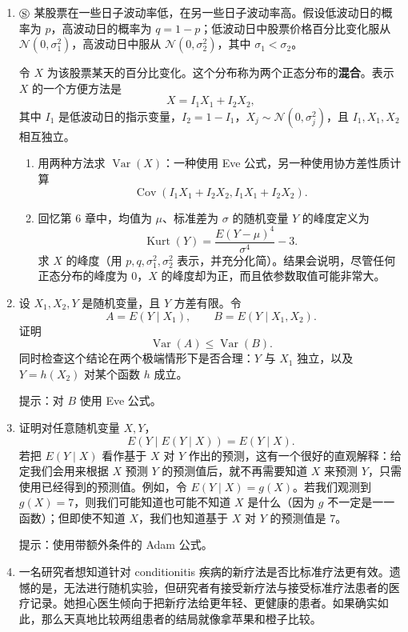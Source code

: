 \documentclass[UTF8, 12pt, fontset=fandol, oneside]{ctexart}
\begin{document}
\begin{enumerate}
  \item $\circledS$ 某股票在一些日子波动率低，在另一些日子波动率高。假设低波动日的概率为 $p$，高波动日的概率为 $q=1-p$；低波动日中股票价格百分比变化服从 $\mathcal N(0,\sigma_1^2)$，高波动日中服从 $\mathcal N(0,\sigma_2^2)$，其中 $\sigma_1<\sigma_2$。

  令 $X$ 为该股票某天的百分比变化。这个分布称为两个正态分布的\textbf{混合}。表示 $X$ 的一个方便方法是
  \[
    X=I_1X_1+I_2X_2,
  \]
  其中 $I_1$ 是低波动日的指示变量，$I_2=1-I_1$，$X_j\sim\mathcal N(0,\sigma_j^2)$，且 $I_1,X_1,X_2$ 相互独立。
  \begin{enumerate}
    \item[(a)] 用两种方法求 $\operatorname{Var}(X)$：一种使用 Eve 公式，另一种使用协方差性质计算
    \[
      \operatorname{Cov}(I_1X_1+I_2X_2,I_1X_1+I_2X_2).
    \]
    \item[(b)] 回忆第 6 章中，均值为 $\mu$、标准差为 $\sigma$ 的随机变量 $Y$ 的峰度定义为
    \[
      \operatorname{Kurt}(Y)=\frac{E(Y-\mu)^4}{\sigma^4}-3.
    \]
    求 $X$ 的峰度（用 $p,q,\sigma_1^2,\sigma_2^2$ 表示，并充分化简）。结果会说明，尽管任何正态分布的峰度为 $0$，$X$ 的峰度却为正，而且依参数取值可能非常大。
  \end{enumerate}

  \item 设 $X_1,X_2,Y$ 是随机变量，且 $Y$ 方差有限。令
  \[
    A=E(Y\mid X_1),\qquad B=E(Y\mid X_1,X_2).
  \]
  证明
  \[
    \operatorname{Var}(A)\le \operatorname{Var}(B).
  \]
  同时检查这个结论在两个极端情形下是否合理：$Y$ 与 $X_1$ 独立，以及 $Y=h(X_2)$ 对某个函数 $h$ 成立。

  \noindent 提示：对 $B$ 使用 Eve 公式。

  \item 证明对任意随机变量 $X,Y$，
  \[
    E(Y\mid E(Y\mid X))=E(Y\mid X).
  \]
  若把 $E(Y\mid X)$ 看作基于 $X$ 对 $Y$ 作出的预测，这有一个很好的直观解释：给定我们会用来根据 $X$ 预测 $Y$ 的预测值后，就不再需要知道 $X$ 来预测 $Y$，只需使用已经得到的预测值。例如，令 $E(Y\mid X)=g(X)$。若我们观测到 $g(X)=7$，则我们可能知道也可能不知道 $X$ 是什么（因为 $g$ 不一定是一一函数）；但即使不知道 $X$，我们也知道基于 $X$ 对 $Y$ 的预测值是 $7$。

  \noindent 提示：使用带额外条件的 Adam 公式。

  \item 一名研究者想知道针对 conditionitis 疾病的新疗法是否比标准疗法更有效。遗憾的是，无法进行随机实验，但研究者有接受新疗法与接受标准疗法患者的医疗记录。她担心医生倾向于把新疗法给更年轻、更健康的患者。如果确实如此，那么天真地比较两组患者的结局就像拿苹果和橙子比较。


\end{enumerate}
\end{document}
